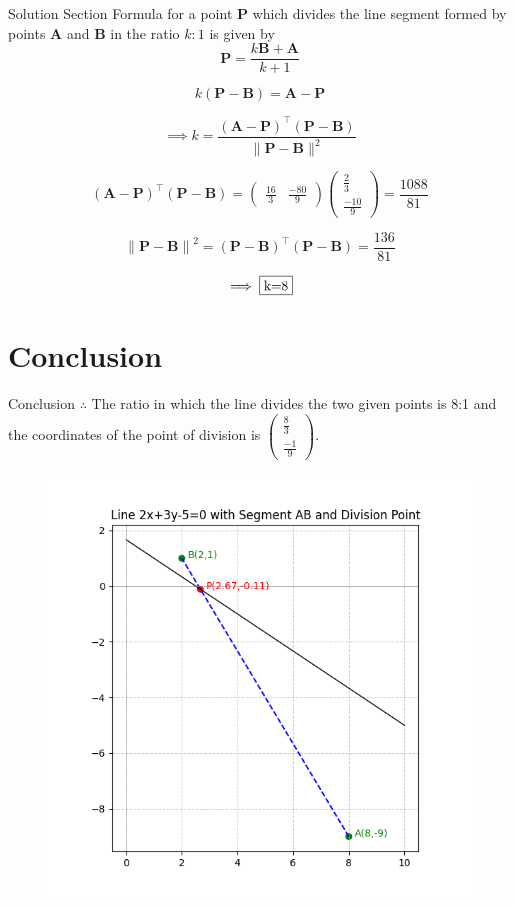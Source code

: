 \documentclass{beamer}
\let\vec\mathbf
\providecommand{\brak}[1]{\ensuremath{\left(#1\right)}}
\theoremstyle{remark}
\providecommand{\norm}[1]{\lVert#1\rVert}
\newcommand{\myvec}[1]{\ensuremath{\begin{pmatrix}#1\end{pmatrix}}}
\begin{document}
\begin{frame}{Solution}
Section Formula for a point $\vec{P}$ which divides the line segment formed by points $\vec{A}$ and $\vec{B}$ in the ratio $k:1$ is given by\\
\begin{equation}
    \vec{P} = \frac{k\vec{B}+\vec{A}}{k+1}
\end{equation}

\begin{equation}
    k\brak{\vec{P}-\vec{B}} = \vec{A} - \vec{P}
\end{equation}

\begin{equation}
    \implies k = \frac{\brak{\vec{A}-\vec{P}}^{\top}\brak{\vec{P}-\vec{B}}}{\norm{\vec{P}-\vec{B}}^2}
\end{equation}

\begin{equation}
    \brak{{\vec{A}-\vec{P}}}^{\top}\brak{\vec{P}-\vec{B}} = \myvec{\frac{16}{3}&\frac{-80}{9}}\myvec{\frac{2}{3}\\ \frac{-10}{9}} = \frac{1088}{81}
\end{equation}

\begin{equation}
    {\norm{\vec{P}-\vec{B}}}^2 = \brak{\vec{P}-\vec{B}}^{\top}\brak{\vec{P}-\vec{B}} = \frac{136}{81}
\end{equation}

\begin{equation}
    \implies \fbox{k=8}
\end{equation}
\end{frame}

\section{Conclusion}
\begin{frame}{Conclusion}
$\therefore$ The ratio in which the line divides the two given points is 8:1 and the coordinates of the point of division is $\myvec{\frac{8}{3}\\ \frac{-1}{9}}$.

\begin{figure}
    \centering
    \includegraphics[width=0.55\columnwidth]{figs/2.png}
    \caption{}
    \label{fig:placeholder}
\end{figure}
\end{frame}
\end{document}
